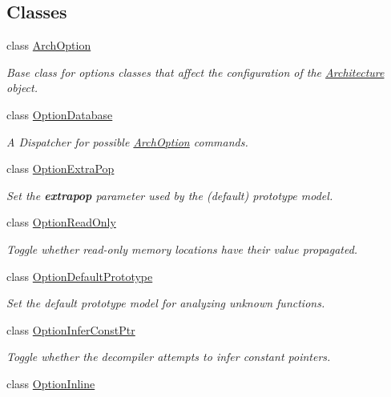\subsection*{Classes}
\begin{DoxyCompactItemize}
\item 
class \mbox{\hyperlink{class_arch_option}{Arch\+Option}}
\begin{DoxyCompactList}\small\item\em Base class for options classes that affect the configuration of the \mbox{\hyperlink{class_architecture}{Architecture}} object. \end{DoxyCompactList}\item 
class \mbox{\hyperlink{class_option_database}{Option\+Database}}
\begin{DoxyCompactList}\small\item\em A Dispatcher for possible \mbox{\hyperlink{class_arch_option}{Arch\+Option}} commands. \end{DoxyCompactList}\item 
class \mbox{\hyperlink{class_option_extra_pop}{Option\+Extra\+Pop}}
\begin{DoxyCompactList}\small\item\em Set the {\bfseries{extrapop}} parameter used by the (default) prototype model. \end{DoxyCompactList}\item 
class \mbox{\hyperlink{class_option_read_only}{Option\+Read\+Only}}
\begin{DoxyCompactList}\small\item\em Toggle whether read-\/only memory locations have their value propagated. \end{DoxyCompactList}\item 
class \mbox{\hyperlink{class_option_default_prototype}{Option\+Default\+Prototype}}
\begin{DoxyCompactList}\small\item\em Set the default prototype model for analyzing unknown functions. \end{DoxyCompactList}\item 
class \mbox{\hyperlink{class_option_infer_const_ptr}{Option\+Infer\+Const\+Ptr}}
\begin{DoxyCompactList}\small\item\em Toggle whether the decompiler attempts to infer constant pointers. \end{DoxyCompactList}\item 
class \mbox{\hyperlink{class_option_inline}{Option\+Inline}}

\end{DoxyCompactItemize}

